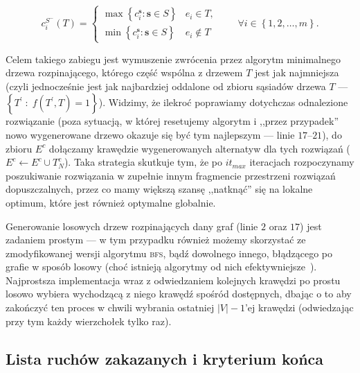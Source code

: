 \begin{equation}
	c^{S^{-}}_{i} \left( T \right) = \left\{\begin{matrix}
	\max \left\{ c^{\textbf{s}}_{i} : \textbf{s} \in S \right\} & e_{i} \in T,\\ 
	\min \left\{ c^{\textbf{s}}_{i} : \textbf{s} \in S \right\} & e_{i} \notin T
	\end{matrix}\right. \qquad \forall i \in \left\{ 1, 2, \dots, m \right\}\text{.}
\end{equation}

Celem takiego zabiegu jest wymuszenie zwrócenia przez algorytm minimalnego drzewa rozpinającego, którego część wspólna z drzewem $T$ jest jak najmniejsza (czyli jednocześnie jest jak najbardziej oddalone od zbioru sąsiadów drzewa $T$ --- $\left\{ T^{\prime} \; : \; f \left( T^{\prime}, T \right) = 1 \right\}$). Widzimy, że ilekroć poprawiamy dotychczas odnalezione rozwiązanie (poza sytuacją, w której resetujemy algorytm i ,,przez przypadek'' nowo wygenerowane drzewo okazuje się być tym najlepszym --- linie $17$--$21$), do zbioru $E^{c}$ dołączamy krawędzie wygenerowanych alternatyw dla tych rozwiązań ($E^{c} \leftarrow E^{c} \cup T_{N}^{c}$). Taka strategia skutkuje tym, że po $it_{max}$ iteracjach rozpoczynamy poszukiwanie rozwiązania w zupełnie innym fragmencie przestrzeni rozwiązań dopuszczalnych, przez co mamy większą szansę ,,natknąć'' się na lokalne optimum, które jest również optymalne globalnie.

Generowanie losowych drzew rozpinających dany graf (linie $2$ oraz $17$) jest zadaniem prostym --- w tym przypadku również możemy skorzystać ze zmodyfikowanej wersji algorytmu \textsc{bfs}, bądź dowolnego innego, błądzącego po grafie w sposób losowy (choć istnieją algorytmy od nich efektywniejsze~\cite{Wilson:1996:GRS:237814.237880}). Najprostsza implementacja wraz z odwiedzaniem kolejnych krawędzi po prostu losowo wybiera wychodzącą z niego krawędź spośród dostępnych, dbając o to aby zakończyć ten proces w chwili wybrania ostatniej $ \left| V \right| - 1$'ej krawędzi (odwiedzając przy tym każdy wierzchołek tylko raz).

\subsection{Lista ruchów zakazanych i kryterium końca}

